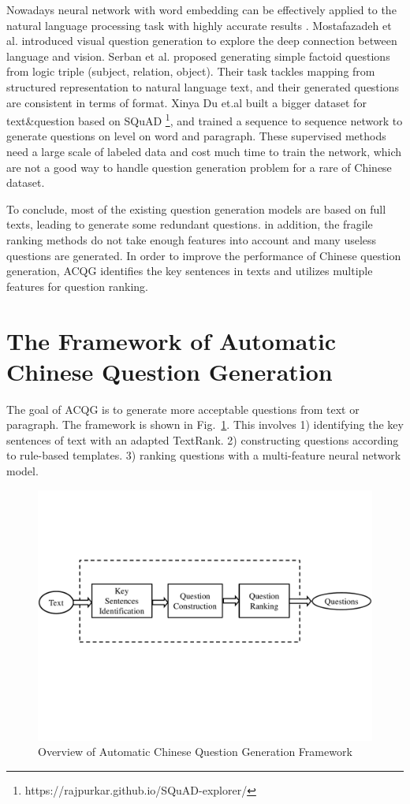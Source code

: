 \documentclass[runningheads,UTF8,article]{comsis2}
\newcommand\revised[1]{{\color{black} #1}}
\begin{document}
	
	Nowadays neural network with word embedding can be effectively applied to the natural language processing task with highly accurate results \cite{NIPS2016_6469,DBLP:journals/corr/VinyalsTBE14}. Mostafazadeh et al. \cite{mostafazadeh2016generating} introduced visual question generation to explore the deep connection between language and vision. Serban et al. \cite{serban2016generating} proposed generating simple factoid questions from logic triple (subject, relation, object). Their task tackles mapping from structured representation to natural language text, and their generated questions are consistent in terms of format. Xinya Du et.al \cite{DBLP:journals/corr/DuSC17} built a bigger dataset for text\&question based on SQuAD \footnote{https://rajpurkar.github.io/SQuAD-explorer/}, and trained a sequence to sequence network to generate questions on level on word and paragraph. These supervised methods need a large scale of labeled data and cost much time to train the network, which are not a good way to handle question generation problem for a rare of Chinese dataset.
	
	
	\revised{To conclude, most of the existing question generation models are based on full texts, leading to generate some redundant questions. in addition, the fragile ranking methods do not take enough features into account and many useless questions are generated. In order to improve the performance of Chinese question generation, ACQG identifies the key sentences in texts and utilizes multiple features for question ranking.}
	
	
	
	\section{The Framework of Automatic Chinese Question Generation}
	The goal of ACQG is to generate more acceptable questions from text or paragraph. The framework is shown in Fig.~\ref{framework}. This involves 1) identifying the key sentences of text with an adapted TextRank. 2) constructing questions according to rule-based templates. 3) ranking questions with a multi-feature neural network model.
	\begin{figure}[h]
		\centering\includegraphics[width=0.7\columnwidth]{framework.pdf}
		\caption{Overview of Automatic Chinese Question Generation Framework}
		\label{framework}
	\end{figure} 
	
\end{document}
